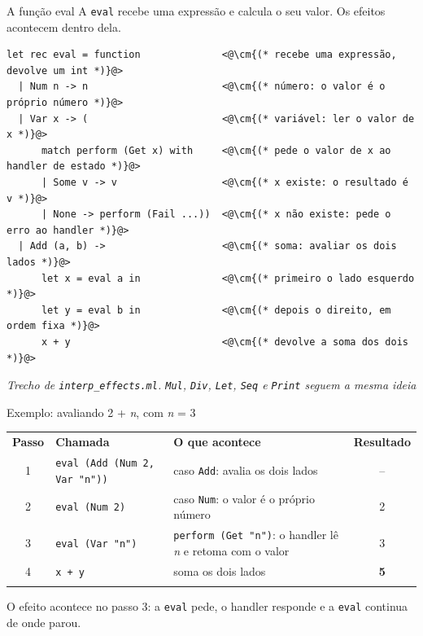 \documentclass[aspectratio=169,10pt,xcolor={table}]{beamer}
\newcommand{\vd}[1]{\textcolor{verdeazul}{#1}}
\newcommand{\legenda}[1]{\par\vskip1.5mm{\centering\footnotesize\itshape\color{corpo!85}#1\par}}
\newcommand{\sep}{\arrayrulecolor{linha}\specialrule{0.4pt}{2.2pt}{2.2pt}}
\newcommand{\topo}{\arrayrulecolor{texto}\specialrule{0.6pt}{0pt}{3pt}}
\newcommand{\meio}{\arrayrulecolor{texto}\specialrule{0.4pt}{3pt}{3pt}}
\newcommand{\fim}{\arrayrulecolor{texto}\specialrule{0.6pt}{3pt}{0pt}}
\newcommand{\cm}[1]{\textcolor{comentario}{\itshape #1}}
\begin{document}
\begin{frame}[fragile]{A função eval}
  A \texttt{eval} recebe uma expressão e calcula o seu valor. Os efeitos acontecem dentro dela.
  \vskip3mm
\begin{lstlisting}[language=OCamlTCC]
let rec eval = function              <@\cm{(* recebe uma expressão, devolve um int *)}@>
  | Num n -> n                       <@\cm{(* número: o valor é o próprio número *)}@>
  | Var x -> (                       <@\cm{(* variável: ler o valor de x *)}@>
      match perform (Get x) with     <@\cm{(* pede o valor de x ao handler de estado *)}@>
      | Some v -> v                  <@\cm{(* x existe: o resultado é v *)}@>
      | None -> perform (Fail ...))  <@\cm{(* x não existe: pede o erro ao handler *)}@>
  | Add (a, b) ->                    <@\cm{(* soma: avaliar os dois lados *)}@>
      let x = eval a in              <@\cm{(* primeiro o lado esquerdo *)}@>
      let y = eval b in              <@\cm{(* depois o direito, em ordem fixa *)}@>
      x + y                          <@\cm{(* devolve a soma dos dois *)}@>
\end{lstlisting}
  \legenda{Trecho de \texttt{interp\_effects.ml}. \texttt{Mul}, \texttt{Div}, \texttt{Let}, \texttt{Seq} e \texttt{Print} seguem a mesma ideia}
\end{frame}

\begin{frame}{Exemplo: avaliando 2 + \textit{n}, com \textit{n} = 3}
  \begin{center}\footnotesize
  \begin{tabular}{cL{4.9cm}L{4.9cm}c}
    \topo
    \textbf{Passo} & \textbf{Chamada} & \textbf{O que acontece} & \textbf{Resultado} \\
    \meio
    1 & \texttt{eval (Add (Num 2, Var "n"))} & caso \texttt{Add}: avalia os dois lados & – \\ \sep
    2 & \texttt{eval (Num 2)} & caso \texttt{Num}: o valor é o próprio número & 2 \\ \sep
    3 & \texttt{eval (Var "n")} & \texttt{perform (Get "n")}: o handler lê \textit{n} e retoma com o valor & 3 \\ \sep
    4 & \texttt{x + y} & soma os dois lados & \vd{\textbf{5}} \\
    \fim
  \end{tabular}
  \end{center}
  \vskip1mm
  O efeito acontece no passo 3: a \texttt{eval} pede, o handler responde e a \texttt{eval} continua de onde parou.
\end{frame}
\end{document}
